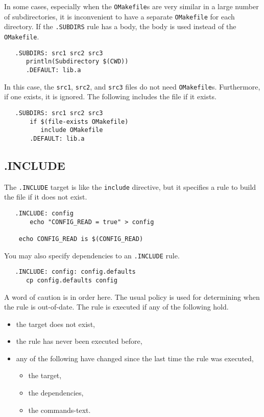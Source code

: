 In some cases, especially when the \verb+OMakefile+s are very similar in a large number of
subdirectories, it is inconvenient to have a separate \verb+OMakefile+ for each directory.  If the
\verb+.SUBDIRS+ rule has a body, the body is used instead of the \verb+OMakefile+.

\begin{verbatim}
   .SUBDIRS: src1 src2 src3
      println(Subdirectory $(CWD))
      .DEFAULT: lib.a
\end{verbatim}

In this case, the \verb+src1+, \verb+src2+, and \verb+src3+ files do not need \verb+OMakefile+s.
Furthermore, if one exists, it is ignored.  The following includes the file if it exists.

\begin{verbatim}
   .SUBDIRS: src1 src2 src3
       if $(file-exists OMakefile)
          include OMakefile
       .DEFAULT: lib.a
\end{verbatim}

\subsection{.INCLUDE}

The \verb+.INCLUDE+ target is like the \verb+include+ directive, but it specifies a rule to build
the file if it does not exist.

\begin{verbatim}
   .INCLUDE: config
       echo "CONFIG_READ = true" > config

    echo CONFIG_READ is $(CONFIG_READ)
\end{verbatim}

You may also specify dependencies to an \verb+.INCLUDE+ rule.

\begin{verbatim}
   .INCLUDE: config: config.defaults
      cp config.defaults config
\end{verbatim}

A word of caution is in order here.  The usual policy is used for determining when the rule is
out-of-date.  The rule is executed if any of the following hold.

\begin{itemize}
\item the target does not exist,
\item the rule has never been executed before,
\item any of the following have changed since the last time the rule was executed,
\begin{itemize}
\item the target,
\item the dependencies,
\item the commands-text.
\end{itemize}
\end{itemize}

